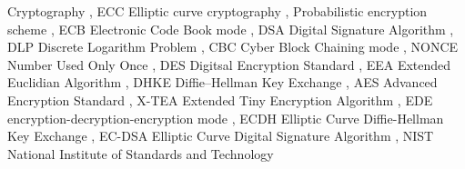 \documentclass[
  10pt,
  a4paper,
]{article}
\begin{document}
\begin{multicols*}{2}
Cryptography {\vspace{2mm}\color{NavyBlue!70},\vspace{2mm}} ECC Elliptic
curve cryptography {\vspace{2mm}\color{NavyBlue!70},\vspace{2mm}}
Probabilistic encryption scheme
{\vspace{2mm}\color{NavyBlue!70},\vspace{2mm}} ECB Electronic Code Book
mode {\vspace{2mm}\color{NavyBlue!70},\vspace{2mm}} DSA Digital
Signature Algorithm {\vspace{2mm}\color{NavyBlue!70},\vspace{2mm}} DLP
Discrete Logarithm Problem
{\vspace{2mm}\color{NavyBlue!70},\vspace{2mm}} CBC Cyber Block Chaining
mode {\vspace{2mm}\color{NavyBlue!70},\vspace{2mm}} NONCE Number Used
Only Once {\vspace{2mm}\color{NavyBlue!70},\vspace{2mm}} DES Digitsal
Encryption Standard {\vspace{2mm}\color{NavyBlue!70},\vspace{2mm}} EEA
Extended Euclidian Algorithm
{\vspace{2mm}\color{NavyBlue!70},\vspace{2mm}} DHKE Diffie--Hellman Key
Exchange {\vspace{2mm}\color{NavyBlue!70},\vspace{2mm}} AES Advanced
Encryption Standard {\vspace{2mm}\color{NavyBlue!70},\vspace{2mm}} X-TEA
Extended Tiny Encryption Algorithm
{\vspace{2mm}\color{NavyBlue!70},\vspace{2mm}} EDE
encryption-decryption-encryption mode
{\vspace{2mm}\color{NavyBlue!70},\vspace{2mm}} ECDH Elliptic Curve
Diffie-Hellman Key Exchange
{\vspace{2mm}\color{NavyBlue!70},\vspace{2mm}} EC-DSA Elliptic Curve
Digital Signature Algorithm
{\vspace{2mm}\color{NavyBlue!70},\vspace{2mm}} NIST National Institute
of Standards and Technology

\end{multicols*}
\end{document}
